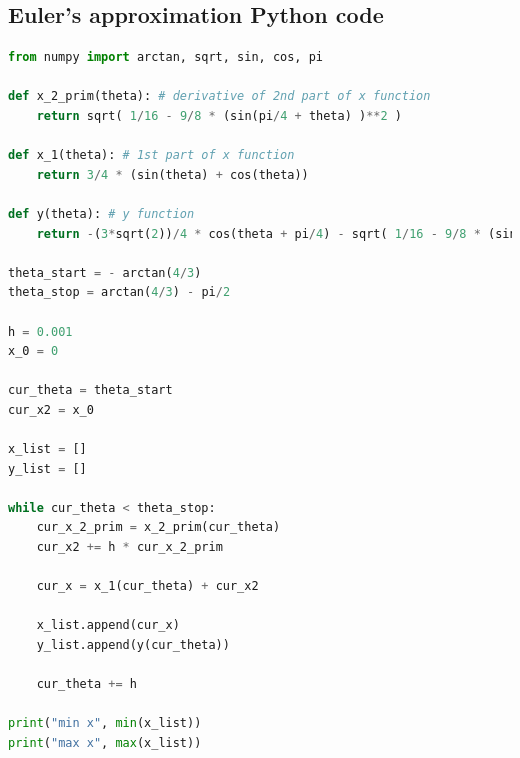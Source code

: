 \documentclass[12pt]{article}
\begin{document}
    \subsection{Euler's approximation Python code}\label{app:euler_python}

    \begin{onehalfspace}
        
    \begin{lstlisting}[language=python]
from numpy import arctan, sqrt, sin, cos, pi

def x_2_prim(theta): # derivative of 2nd part of x function
    return sqrt( 1/16 - 9/8 * (sin(pi/4 + theta) )**2 )

def x_1(theta): # 1st part of x function
    return 3/4 * (sin(theta) + cos(theta))

def y(theta): # y function
    return -(3*sqrt(2))/4 * cos(theta + pi/4) - sqrt( 1/16 - 9/8 * (sin(pi/4 + theta) )**2 )

theta_start = - arctan(4/3)
theta_stop = arctan(4/3) - pi/2 

h = 0.001
x_0 = 0

cur_theta = theta_start
cur_x2 = x_0

x_list = []
y_list = []

while cur_theta < theta_stop:
    cur_x_2_prim = x_2_prim(cur_theta)    
    cur_x2 += h * cur_x_2_prim
    
    cur_x = x_1(cur_theta) + cur_x2
    
    x_list.append(cur_x)
    y_list.append(y(cur_theta))

    cur_theta += h

print("min x", min(x_list))
print("max x", max(x_list))\end{lstlisting}

    \end{onehalfspace}
\end{document}
